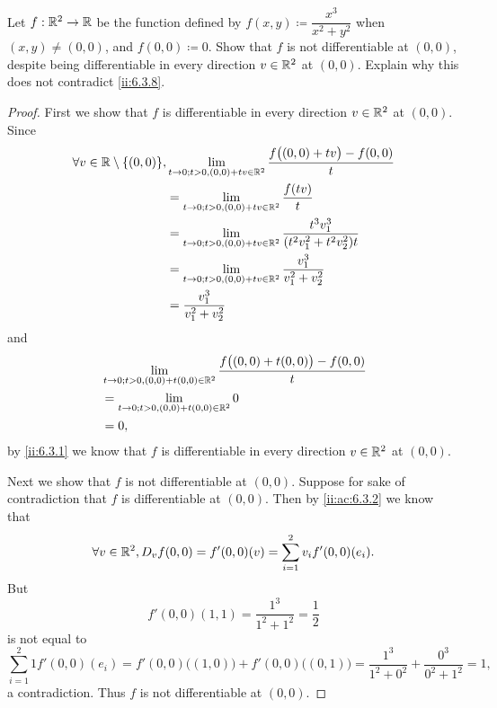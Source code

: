 \begin{ex}\label{ii:ex:6.3.3}
  Let \(f : \mathbb{R}^2 \to \mathbb{R}\) be the function defined by \(f(x, y) \coloneqq \dfrac{x^3}{x^2 + y^2}\) when \((x, y) \neq (0, 0)\), and \(f(0, 0) \coloneqq 0\).
  Show that \(f\) is not differentiable at \((0, 0)\), despite being differentiable in every direction \(v \in \mathbb{R}^2\) at \((0, 0)\).
  Explain why this does not contradict \cref{ii:6.3.8}.
\end{ex}

\begin{proof}
  First we show that \(f\) is differentiable in every direction \(v \in \mathbb{R}^2\) at \((0, 0)\).
  Since
  \begin{align*}
    \forall v \in \R \setminus \set{(0, 0)}, & \lim_{t \to 0 ; t > 0, (0, 0) + tv \in \R^2} \dfrac{f\big((0, 0) + tv\big) - f(0, 0)}{t}    \\
                                             & = \lim_{t \to 0 ; t > 0, (0, 0) + tv \in \R^2} \dfrac{f(tv)}{t}                             \\
                                             & = \lim_{t \to 0 ; t > 0, (0, 0) + tv \in \R^2} \dfrac{t^3 v_1^3}{(t^2 v_1^2 + t^2 v_2^2) t} \\
                                             & = \lim_{t \to 0 ; t > 0, (0, 0) + tv \in \R^2} \dfrac{v_1^3}{v_1^2 + v_2^2}                 \\
                                             & = \dfrac{v_1^3}{v_1^2 + v_2^2}
  \end{align*}
  and
  \begin{align*}
     & \lim_{t \to 0 ; t > 0, (0, 0) + t (0, 0) \in \mathbb{R}^2} \dfrac{f\big((0, 0) + t(0, 0)\big) - f(0, 0)}{t} \\
     & = \lim_{t \to 0 ; t > 0, (0, 0) + t (0, 0) \in \mathbb{R}^2} 0                                              \\
     & = 0,
  \end{align*}
  by \cref{ii:6.3.1} we know that \(f\) is differentiable in every direction \(v \in \mathbb{R}^2\) at \((0, 0)\).

  Next we show that \(f\) is not differentiable at \((0, 0)\).
  Suppose for sake of contradiction that \(f\) is differentiable at \((0, 0)\).
  Then by \cref{ii:ac:6.3.2} we know that
  \[
    \forall v \in \mathbb{R}^2, D_v f(0, 0) = f'(0, 0)(v) = \sum_{i = 1}^2 v_i f'(0, 0)(e_i).
  \]
  But
  \[
    f'(0, 0)(1, 1) = \dfrac{1^3}{1^2 + 1^2} = \dfrac{1}{2}
  \]
  is not equal to
  \[
    \sum_{i = 1}^2 1 f'(0, 0)(e_i) = f'(0, 0)\big((1, 0)\big) + f'(0, 0)\big((0, 1)\big) = \dfrac{1^3}{1^2 + 0^2} + \dfrac{0^3}{0^2 + 1^2} = 1,
  \]
  a contradiction.
  Thus \(f\) is not differentiable at \((0, 0)\).


\end{proof}
